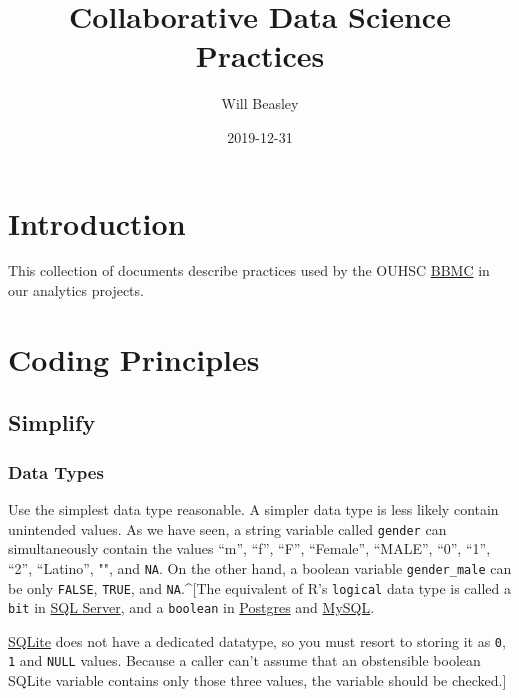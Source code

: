 \documentclass[
]{book}
\title{Collaborative Data Science Practices}
\author{Will Beasley}
\date{2019-12-31}
\begin{document}
\frontmatter
\maketitle

{
\setcounter{tocdepth}{1}
\tableofcontents
}
\mainmatter
\hypertarget{intro}{%
\chapter{Introduction}\label{intro}}

This collection of documents describe practices used by the OUHSC \href{https://ouhsc.edu/bbmc}{BBMC} in our analytics projects.

\hypertarget{coding}{%
\chapter{Coding Principles}\label{coding}}

\hypertarget{simplify}{%
\section{Simplify}\label{simplify}}

\hypertarget{data-types}{%
\subsection{Data Types}\label{data-types}}

Use the simplest data type reasonable. A simpler data type is less likely contain unintended values. As we have seen, a string variable called \texttt{gender} can simultaneously contain the values ``m'', ``f'', ``F'', ``Female'', ``MALE'', ``0'', ``1'', ``2'', ``Latino'', "", and \texttt{NA}. On the other hand, a boolean variable \texttt{gender\_male} can be only \texttt{FALSE}, \texttt{TRUE}, and \texttt{NA}.\^{}{[}The equivalent of R's \texttt{logical} data type is called a \texttt{bit} in \href{https://docs.microsoft.com/en-us/sql/t-sql/data-types/bit-transact-sql}{SQL Server}, and a \texttt{boolean} in \href{https://www.postgresql.org/docs/current/datatype-boolean.html}{Postgres} and \href{https://dev.mysql.com/doc/refman/8.0/en/boolean-literals.html}{MySQL}.

\href{https://www.sqlite.org/datatype3.html}{SQLite} does not have a dedicated datatype, so you must resort to storing it as \texttt{0}, \texttt{1} and \texttt{NULL} values. Because a caller can't assume that an obstensible boolean SQLite variable contains only those three values, the variable should be checked.{]}
\end{document}
